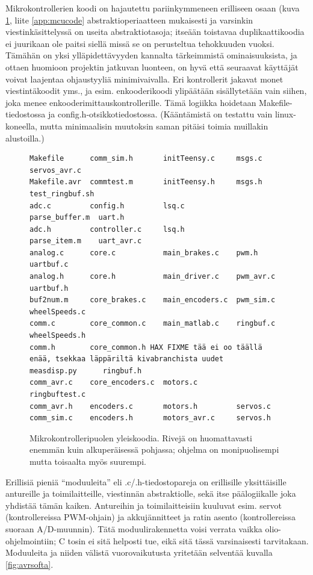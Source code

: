 \documentclass{article}
\begin{document}
Mikrokontrollerien koodi on hajautettu pariinkymmeneen erilliseen osaan (kuva \ref{fig:mcucode}, liite \ref{app:mcucode} abstraktioperiaatteen mukaisesti ja varsinkin viestinkäsittelyssä on useita abstraktiotasoja; itseään toistavaa duplikaattikoodia ei juurikaan ole paitsi siellä missä se on perusteltua tehokkuuden vuoksi. Tämähän on yksi ylläpidettävyyden kannalta tärkeimmistä ominaisuuksista, ja ottaen huomioon projektin jatkuvan luonteen, on hyvä että seuraavat käyttäjät voivat laajentaa ohjaustyyliä minimivaivalla. Eri kontrollerit jakavat monet viestintäkoodit yms., ja esim. enkooderikoodi ylipäätään sisällytetään vain siihen, joka menee enkooderimittauskontrollerille. Tämä logiikka hoidetaan Makefile-tiedostossa \cite{bib:make} ja config.h-otsikkotiedostossa. (Kääntämistä on testattu vain linux-koneella, mutta minimaalisin muutoksin saman pitäisi toimia muillakin alustoilla.)

\begin{figure}[h!]
\begin{verbatim}
Makefile      comm_sim.h       initTeensy.c     msgs.c          servos_avr.c
Makefile.avr  commtest.m       initTeensy.h     msgs.h          test_ringbuf.sh
adc.c         config.h         lsq.c            parse_buffer.m  uart.h
adc.h         controller.c     lsq.h            parse_item.m    uart_avr.c
analog.c      core.c           main_brakes.c    pwm.h           uartbuf.c
analog.h      core.h           main_driver.c    pwm_avr.c       uartbuf.h
buf2num.m     core_brakes.c    main_encoders.c  pwm_sim.c       wheelSpeeds.c
comm.c        core_common.c    main_matlab.c    ringbuf.c       wheelSpeeds.h
comm.h        core_common.h HAX FIXME tää ei oo täällä enää, tsekkaa läppäriltä kivabranchista uudet    measdisp.py      ringbuf.h
comm_avr.c    core_encoders.c  motors.c         ringbuftest.c
comm_avr.h    encoders.c       motors.h         servos.c
comm_sim.c    encoders.h       motors_avr.c     servos.h
\end{verbatim}
\caption{Mikrokontrolleripuolen yleiskoodia. Rivejä on huomattavasti enemmän kuin alkuperäisessä pohjassa; ohjelma on monipuolisempi mutta toisaalta myös suurempi. \label{fig:mcucode}}
\end{figure}

Erillisiä pieniä ``moduuleita'' eli .c/.h-tiedostopareja on erillisille yksittäisille antureille ja toimilaitteille, viestinnän abstraktiolle, sekä itse päälogiikalle joka yhdistää tämän kaiken. Antureihin ja toimilaitteisiin kuuluvat esim. servot (kontrollereissa PWM-ohjain) ja akkujännitteet ja ratin asento (kontrollereissa suoraan A/D-muunnin). Tätä moduulirakennetta voisi verrata vaikka olio-ohjelmointiin; C tosin ei sitä helposti tue, eikä sitä tässä varsinaisesti tarvitakaan. Moduuleita ja niiden välistä vuorovaikutusta yritetään selventää kuvalla \ref{fig:avrsofta}.
\end{document}
